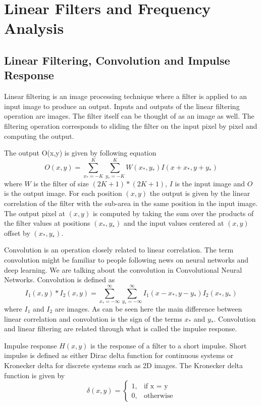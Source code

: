 \documentclass[]{article}
\begin{document}
\section{Linear Filters and Frequency Analysis}
\label{linear-filters-and-frequency-analysis}

\subsection{Linear Filtering, Convolution and Impulse Response}
\label{linear-filtering}

Linear filtering is an image processing technique where a filter is applied to
an input image to produce an output. Inputs and outputs of the linear filtering
operation are images. The filter itself can be thought of as an image as well.
The filtering operation corresponds to sliding the filter on the input pixel by
pixel and computing the output. 

The output O(x,y) is given by following equation
\begin{equation}
  \label{eq:linear-filtering}
  O(x,y) = \sum_{x_*=-K}^{K}\sum_{y_*=-K}^{K}{W(x_*,y_*)I(x+x_*,y+y_*)}
\end{equation}
where $W$ is the filter of size $(2K+1)*(2K+1)$, $I$ is the input image and $O$
is the output image. For each position $(x,y)$ the output is given by the
linear correlation of the filter with the sub-area in the same position in the
input image. The output pixel at $(x,y)$ is computed by taking the sum over the
products of the filter values at positions $(x_*,y_*)$ and the input values
centered at $(x,y)$ offset by $(x_*,y_*)$.

Convolution is an operation closely related to linear correlation. The term
convolution might be familiar to people following news on neural networks and
deep learning. We are talking about the convolution in Convolutional Neural
Networks. Convolution is defined as
\begin{equation}
  I_1(x,y) \ast I_2(x,y) = \sum_{x_*=-\infty}^{\infty}\sum_{y_*=-\infty}^{\infty}{I_1(x-x_*,y-y_*)I_2(x_*,y_*)}
\end{equation}
where $I_1$ and $I_2$ are images. As can be seen here the main difference
between linear correlation and convolution is the sign of the terms $x_*$ and
$y_*$. Convolution and linear filtering are related through what is called the
impulse response.

Impulse response $H(x,y)$ is the response of a filter to a short impulse. Short
impulse is defined as either Dirac delta function for continuous systems or
Kronecker delta for discrete systems such as 2D images. The Kronecker delta
function is given by
\begin{equation}
  \delta(x,y) = \begin{cases}
    1, & \text{if x = y}\\
    0, & \text{otherwise}
  \end{cases}
\end{equation}
\end{document}
